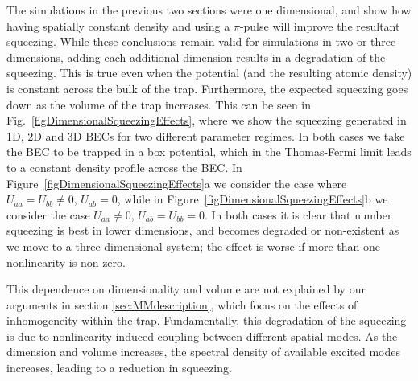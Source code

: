\documentclass{iopart}
\begin{document}
The simulations in the previous two sections were one dimensional, and show how having spatially constant density and using a $\pi$-pulse will improve the resultant squeezing.  While these conclusions remain valid for simulations in two or three dimensions, adding each additional dimension results in a degradation of the squeezing.  This is true even when the potential (and the resulting atomic density) is constant across the bulk of the trap.  Furthermore, the expected squeezing goes down as the volume of the trap increases.  This can be seen in Fig.~\ref{figDimensionalSqueezingEffects}, where we show the squeezing generated in 1D, 2D and 3D BECs for two different parameter regimes. In both cases we take the BEC to be trapped in a box potential, which in the Thomas-Fermi limit leads to a constant density profile across the BEC. In Figure~\ref{figDimensionalSqueezingEffects}a we consider the case where $U_{aa}=U_{bb}\neq 0$, $U_{ab}=0$, while in Figure~\ref{figDimensionalSqueezingEffects}b we consider the case $U_{aa}\neq 0$, $U_{ab}=U_{bb}=0$. In both cases it is clear that number squeezing is best in lower dimensions, and becomes degraded or non-existent as we move to a three dimensional system; the effect is worse if more than one nonlinearity is non-zero.


This dependence on dimensionality and volume are not explained by our arguments in section \ref{sec:MMdescription}, which focus on the effects of inhomogeneity within the trap.  Fundamentally, this degradation of the squeezing is due to nonlinearity-induced coupling between different spatial modes.  As the dimension and volume increases, the spectral density of available excited modes increases, leading to a reduction in squeezing.  
\end{document}
